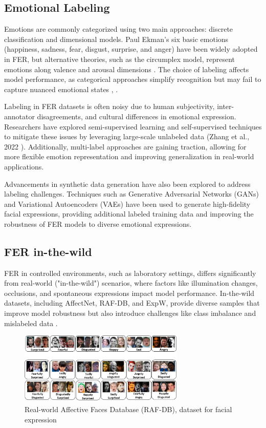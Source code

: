 \subsection{Emotional Labeling}

Emotions are commonly categorized using two main approaches: discrete classification and dimensional models. Paul Ekman’s six basic emotions (happiness, sadness, fear, disgust, surprise, and anger) have been widely adopted in FER, but alternative theories, such as the circumplex model, represent emotions along valence and arousal dimensions \cite{russell_circumplex_1980}. The choice of labeling affects model performance, as categorical approaches simplify recognition but may fail to capture nuanced emotional states \cite{mollahosseini_affectnet_2019}, \cite{kollias_affect_2021}. 

Labeling in FER datasets is often noisy due to human subjectivity, inter-annotator disagreements, and cultural differences in emotional expression. Researchers have explored semi-supervised learning and self-supervised techniques to mitigate these issues by leveraging large-scale unlabeled data (Zhang et al., 2022 \cite{zhang_transformer-based_2022}). Additionally, multi-label approaches are gaining traction, allowing for more flexible emotion representation and improving generalization in real-world applications. 

Advancements in synthetic data generation have also been explored to address labeling challenges. Techniques such as Generative Adversarial Networks (GANs) and Variational Autoencoders (VAEs) have been used to generate high-fidelity facial expressions, providing additional labeled training data and improving the robustness of FER models to diverse emotional expressions. 

\subsection{FER in-the-wild}

FER in controlled environments, such as laboratory settings, differs significantly from real-world ("in-the-wild") scenarios, where factors like illumination changes, occlusions, and spontaneous expressions impact model performance. In-the-wild datasets, including AffectNet, RAF-DB, and ExpW, provide diverse samples that improve model robustness but also introduce challenges like class imbalance and mislabeled data \cite{zhang_leave_2023}. 


\begin{figure}[H]
\centering
   \includegraphics[width=0.70\textwidth]{../images/faces_rafdb_dataset.png}
\caption{Real-world Affective Faces Database (RAF-DB), dataset for facial expression}
\label{fig:RAF-DB}
\end{figure}

